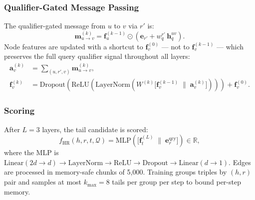 \documentclass[10pt,journal,compsoc]{IEEEtran}
\begin{document}
\subsubsection{Qualifier-Gated Message Passing}
The qualifier-gated message from $u$ to $v$ via $r'$ is:
\begin{equation}
  \mathbf{m}_{u \to v}^{(k)}
  = \mathbf{f}_u^{(k-1)}
    \odot
    \!\left(
      \mathbf{e}_{r'} + w_q^{r'}\,\mathbf{h}_q^{uv}
    \right).
  \label{eq:hr_msg}
\end{equation}
Node features are updated with a shortcut to
$\mathbf{f}_v^{(0)}$ — not to $\mathbf{f}_v^{(k-1)}$ —
which preserves the full query qualifier signal throughout
all layers:
\begin{align}
  \mathbf{a}_v^{(k)}
  &= \sum_{(u,r',v)} \mathbf{m}_{u \to v}^{(k)},
  \label{eq:hr_agg} \\
  \mathbf{f}_v^{(k)}
  &= \mathrm{Dropout}\!\left(
       \mathrm{ReLU}\!\left(
         \mathrm{LayerNorm}\!\left(
           W^{(k)}
           \bigl[\mathbf{f}_v^{(k-1)}
           \;\|\; \mathbf{a}_v^{(k)}\bigr]
         \right)
       \right)
     \right)
     + \mathbf{f}_v^{(0)}.
  \label{eq:hr_update}
\end{align}

\subsubsection{Scoring}
After $L{=}3$ layers, the tail candidate is scored:
\begin{equation}
  f_{\mathrm{HR}}(h,r,t,\mathcal{Q})
  = \mathrm{MLP}\!\left(
      \bigl[
        \mathbf{f}_t^{(L)}
        \;\|\;
        \mathbf{e}_r^{\mathrm{qry}}
      \bigr]
    \right) \in \mathbb{R},
  \label{eq:hr_score}
\end{equation}
where the MLP is
$\mathrm{Linear}(2d{\to}d) \to \mathrm{LayerNorm}
 \to \mathrm{ReLU} \to \mathrm{Dropout}
 \to \mathrm{Linear}(d{\to}1)$.
Edges are processed in memory-safe chunks of 5{,}000.
Training groups triples by $(h,r)$ pair and samples at most
$k_{\max}{=}8$ tails per group per step to bound per-step
memory.
\end{document}
